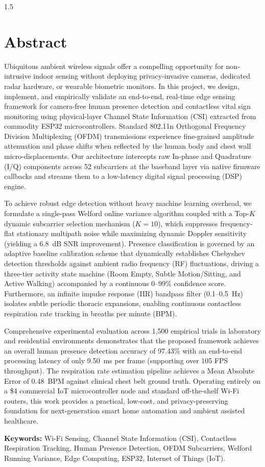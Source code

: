\newpage
{}
\thispagestyle{empty}
\begin{spacing}{1.5}
\chapter*{Abstract}

Ubiquitous ambient wireless signals offer a compelling opportunity for non-intrusive indoor sensing without deploying privacy-invasive cameras, dedicated radar hardware, or wearable biometric monitors. In this project, we design, implement, and empirically validate an end-to-end, real-time edge sensing framework for camera-free human presence detection and contactless vital sign monitoring using physical-layer Channel State Information (CSI) extracted from commodity ESP32 microcontrollers. Standard 802.11n Orthogonal Frequency Division Multiplexing (OFDM) transmissions experience fine-grained amplitude attenuation and phase shifts when reflected by the human body and chest wall micro-displacements. Our architecture intercepts raw In-phase and Quadrature (I/Q) components across 52 subcarriers at the baseband layer via native firmware callbacks and streams them to a low-latency digital signal processing (DSP) engine.

To achieve robust edge detection without heavy machine learning overhead, we formulate a single-pass Welford online variance algorithm coupled with a Top-$K$ dynamic subcarrier selection mechanism ($K=10$), which suppresses frequency-flat stationary multipath noise while maximizing dynamic Doppler sensitivity (yielding a 6.8~dB SNR improvement). Presence classification is governed by an adaptive baseline calibration scheme that dynamically establishes Chebyshev detection thresholds against ambient radio frequency (RF) fluctuations, driving a three-tier activity state machine (Room Empty, Subtle Motion/Sitting, and Active Walking) accompanied by a continuous 0--99\% confidence score. Furthermore, an infinite impulse response (IIR) bandpass filter (0.1--0.5~Hz) isolates subtle periodic thoracic expansions, enabling continuous contactless respiration rate tracking in breaths per minute (BPM).

Comprehensive experimental evaluation across 1,500 empirical trials in laboratory and residential environments demonstrates that the proposed framework achieves an overall human presence detection accuracy of 97.43\% with an end-to-end processing latency of only 9.50~ms per frame (supporting over 105 FPS throughput). The respiration rate estimation pipeline achieves a Mean Absolute Error of 0.48~BPM against clinical chest belt ground truth. Operating entirely on a \$4 commercial IoT microcontroller node and standard off-the-shelf Wi-Fi routers, this work provides a practical, low-cost, and privacy-preserving foundation for next-generation smart home automation and ambient assisted healthcare.

\vspace{0.8cm}
\noindent \textbf{Keywords:} Wi-Fi Sensing, Channel State Information (CSI), Contactless Respiration Tracking, Human Presence Detection, OFDM Subcarriers, Welford Running Variance, Edge Computing, ESP32, Internet of Things (IoT).
\end{spacing}
